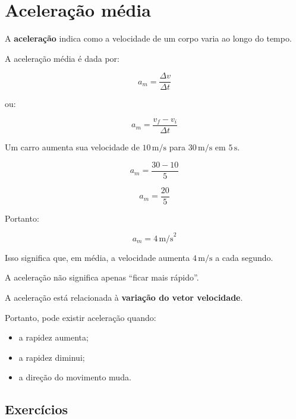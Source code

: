 \documentclass[a4paper,12pt]{article}
\begin{document}
\section{Aceleração média}

\begin{ideia}

A \textbf{aceleração} indica como a velocidade de um corpo
varia ao longo do tempo.

A aceleração média é dada por:

\[
\boxed{
a_m=
\frac{\Delta v}{\Delta t}
}
\]

ou:

\[
\boxed{
a_m=
\frac{v_f-v_i}{\Delta t}
}
\]

\end{ideia}


\begin{exemplo}

Um carro aumenta sua velocidade de $10\,\text{m/s}$ para
$30\,\text{m/s}$ em $5\,\text{s}$.

\[
a_m=
\frac{30-10}{5}
\]

\[
a_m=
\frac{20}{5}
\]

Portanto:

\[
\boxed{
a_m=4\,\text{m/s}^2
}
\]

Isso significa que, em média, a velocidade aumenta
$4\,\text{m/s}$ a cada segundo.

\end{exemplo}


\begin{atencao}

A aceleração não significa apenas ``ficar mais rápido''.

A aceleração está relacionada à \textbf{variação do vetor velocidade}.

Portanto, pode existir aceleração quando:

\begin{itemize}
    \item a rapidez aumenta;
    \item a rapidez diminui;
    \item a direção do movimento muda.
\end{itemize}

\end{atencao}


\subsection*{Exercícios}
\end{document}
